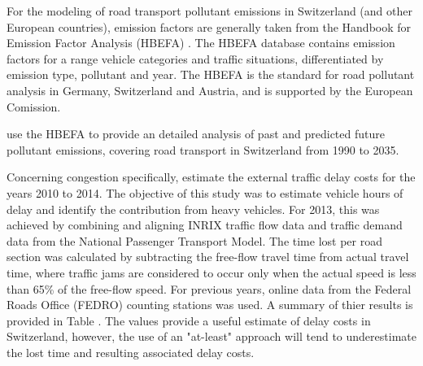For the modeling of road transport pollutant emissions in Switzerland (and other European countries), emission factors are generally taken from the Handbook for Emission Factor Analysis (HBEFA) \cite{maibach2008emissions}.
The HBEFA database contains emission factors for a range vehicle categories and traffic situations, differentiated by emission type, pollutant and year. The HBEFA is the standard for road pollutant analysis in Germany, Switzerland and Austria, and is supported by the European Comission. 

\citet{foen2010pollutants} use the HBEFA to provide an detailed analysis of past and predicted future pollutant emissions, covering road transport in Switzerland from 1990 to 2035.

Concerning congestion specifically, \cite{mkinfras2016staukosten} estimate the external traffic delay costs for the years 2010 to 2014.
The objective of this study was to estimate vehicle hours of delay and identify the contribution from heavy vehicles.
For 2013, this was achieved by combining and aligning INRIX traffic flow data and traffic demand data from the National Passenger Transport Model.
The time lost per road section was calculated by subtracting the free-flow travel time from actual travel time, where traffic jams are considered to occur only when the actual speed is less than 65\% of the free-flow speed.
For previous years, online data from the Federal Roads Office (FEDRO) counting stations was used.
A summary of thier results is provided in Table .
The values provide a useful estimate of delay costs in Switzerland, however, the use of an "at-least" approach will tend to underestimate the lost time and resulting associated delay costs. 


